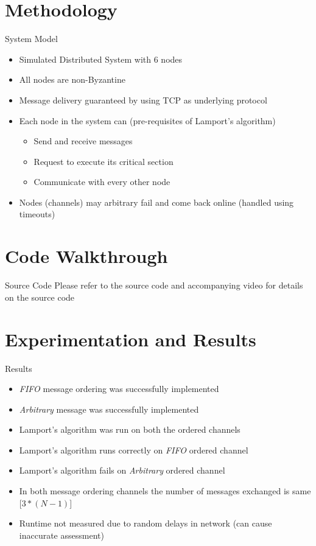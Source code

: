 \documentclass{beamer}
\begin{document}
\section{Methodology}
	\begin{frame}{System Model}
		\begin{itemize}
			\item Simulated Distributed System with 6 nodes
			\item All nodes are non-Byzantine
			\item Message delivery guaranteed by using TCP as underlying protocol
			\item Each node in the system can (pre-requisites of Lamport's algorithm)
			\begin{itemize}
				\item Send and receive messages
				\item Request to execute its critical section
				\item Communicate with every other node
			\end{itemize}
			\item Nodes (channels) may arbitrary fail and come back online (handled using timeouts)
		\end{itemize}
	\end{frame}


\section{Code Walkthrough}
	\begin{frame}{Source Code}
		\Large{Please refer to the source code and accompanying video for details on the source code}
	\end{frame}	



\section{Experimentation and Results}
	\begin{frame}{Results}
		\begin{itemize}
			\item \textit{FIFO} message ordering was successfully implemented
			\item \textit{Arbitrary} message was successfully implemented
			\item Lamport's algorithm was run on both the ordered channels
			\item Lamport's algorithm runs correctly on \textit{FIFO} ordered channel
			\item Lamport's algorithm fails on \textit{Arbitrary} ordered channel
			\item In both message ordering channels the number of messages exchanged is same [$3*(N-1)$]
			\item Runtime not measured due to random delays in network (can cause inaccurate assessment)
		\end{itemize}
	\end{frame}
	
\end{document}
